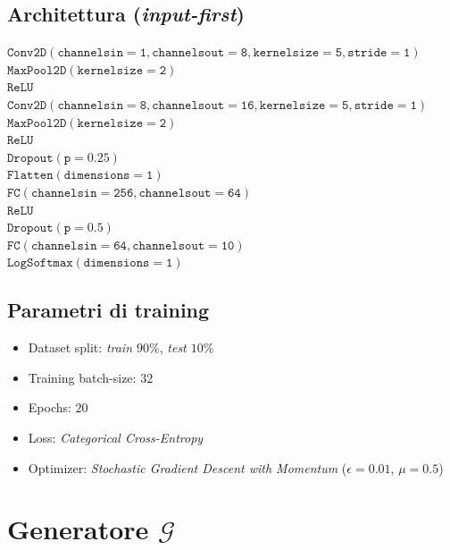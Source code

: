 \documentclass[a4paper, twoside]{article}
\begin{document}
\subsection{Architettura (\textit{input-first})}
$\mathtt{Conv2D (channels in = 1, channels out = 8, kernel size = 5, stride = 1) }$\\
$\mathtt{MaxPool2D (kernel size = 2)}$\\
$\mathtt{ReLU}$\\
$\mathtt{Conv2D (channels in = 8, channels out = 16, kernel size = 5, stride = 1) }$\\
$\mathtt{MaxPool2D (kernel size = 2)}$\\
$\mathtt{ReLU}$\\
$\mathtt{Dropout (p = 0.25)}$\\
$\mathtt{Flatten (dimensions = 1)}$\\
$\mathtt{FC (channels in = 256, channels out = 64)}$\\
$\mathtt{ReLU}$\\
$\mathtt{Dropout (p = 0.5)}$\\
$\mathtt{FC (channels in = 64, channels out = 10)}$\\
$\mathtt{LogSoftmax (dimensions = 1)}$\\

\subsection{Parametri di training}
\begin{itemize}
	\item {Dataset split: \textit{train $90\%$}, \textit{test $10\%$}}
	\item {Training batch-size: $32$}
	\item {Epochs: $20$}
	\item {Loss: \textit{Categorical Cross-Entropy}}
	\item {Optimizer: \textit{Stochastic Gradient Descent with Momentum} ($\epsilon=0.01$, $\mu=0.5$)}
\end{itemize}


\section{Generatore $\mathcal{G}$}
\end{document}
